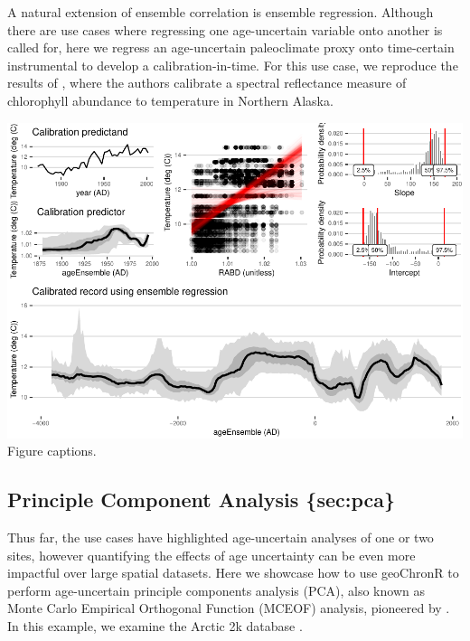 \documentclass[gc, manuscript]{copernicus}
\begin{document}
A natural extension of ensemble correlation is ensemble regression.
Although there are use cases where regressing one age-uncertain variable
onto another is called for, here we regress an age-uncertain
paleoclimate proxy onto time-certain instrumental to develop a
calibration-in-time. For this use case, we reproduce the results of
\citet{Boldt:2015}, where the authors calibrate a spectral reflectance
measure of chlorophyll abundance to temperature in Northern Alaska.

\includegraphics{geoChronR-paper_files/figure-latex/unnamed-chunk-10-1.pdf}
Figure captions.

\subsection{Principle Component Analysis \{sec:pca\}}

Thus far, the use cases have highlighted age-uncertain analyses of one
or two sites, however quantifying the effects of age uncertainty can be
even more impactful over large spatial datasets. Here we showcase how to
use geoChronR to perform age-uncertain principle components analysis
(PCA), also known as Monte Carlo Empirical Orthogonal Function (MCEOF)
analysis, pioneered by \citet{anchukaitis2013mceof}. In this example, we
examine the Arctic 2k database \citep{McKayKaufman2014}.
\end{document}
